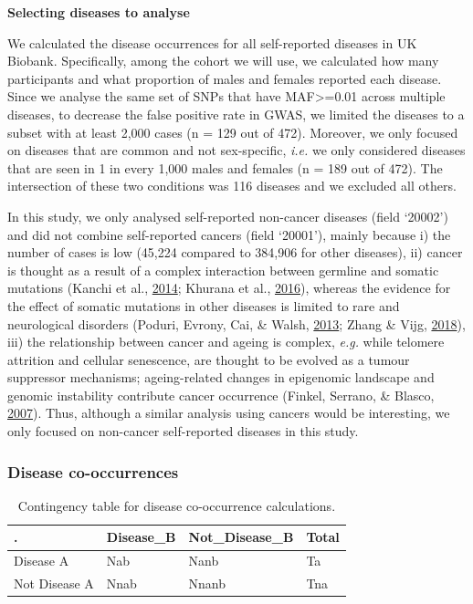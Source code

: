 \documentclass[12pt,twoside]{unicam}
\begin{document}
\textbf{Selecting diseases to analyse}

We calculated the disease occurrences for all self-reported diseases in UK Biobank. Specifically, among the cohort we will use, we calculated how many participants and what proportion of males and females reported each disease. Since we analyse the same set of SNPs that have MAF\textgreater=0.01 across multiple diseases, to decrease the false positive rate in GWAS, we limited the diseases to a subset with at least 2,000 cases (n = 129 out of 472). Moreover, we only focused on diseases that are common and not sex-specific, \emph{i.e.} we only considered diseases that are seen in 1 in every 1,000 males and females (n = 189 out of 472). The intersection of these two conditions was 116 diseases and we excluded all others.

In this study, we only analysed self-reported non-cancer diseases (field `20002') and did not combine self-reported cancers (field `20001'), mainly because i) the number of cases is low (45,224 compared to 384,906 for other diseases), ii) cancer is thought as a result of a complex interaction between germline and somatic mutations (Kanchi et al., \protect\hyperlink{ref-Kanchi2014}{2014}; Khurana et al., \protect\hyperlink{ref-Khurana2016}{2016}), whereas the evidence for the effect of somatic mutations in other diseases is limited to rare and neurological disorders (Poduri, Evrony, Cai, \& Walsh, \protect\hyperlink{ref-Poduri2013}{2013}; Zhang \& Vijg, \protect\hyperlink{ref-Zhang2018}{2018}), iii) the relationship between cancer and ageing is complex, \emph{e.g.} while telomere attrition and cellular senescence, are thought to be evolved as a tumour suppressor mechanisms; ageing-related changes in epigenomic landscape and genomic instability contribute cancer occurrence (Finkel, Serrano, \& Blasco, \protect\hyperlink{ref-Finkel2007}{2007}). Thus, although a similar analysis using cancers would be interesting, we only focused on non-cancer self-reported diseases in this study.

\hypertarget{disease-co-occurrences-1}{%
\subsubsection{Disease co-occurrences}\label{disease-co-occurrences-1}}

\begingroup\fontsize{12}{14}\selectfont

\begin{longtable}[t]{llll}
\caption{\label{tab:discooccurTable}Contingency table for disease co-occurrence calculations.}\\
\toprule
. & Disease\_B & Not\_Disease\_B & Total\\
\midrule
Disease A & Nab & Nanb & Ta\\
Not Disease A & Nnab & Nnanb & Tna\\
\bottomrule
\end{longtable}
\endgroup{}
\end{document}
